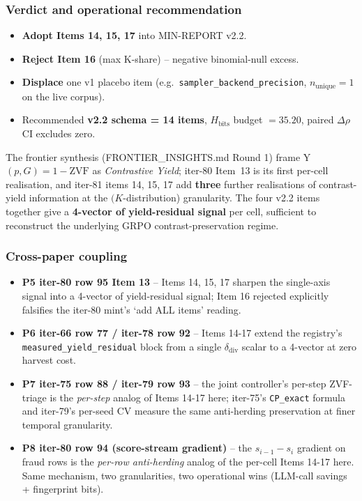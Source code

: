 \documentclass{article}  \usepackage[preprint,nonatbib]{neurips_2026} \usepackage[numbers]{natbib}
\begin{document}
\subsubsection{Verdict and operational recommendation}
\begin{itemize}
  \item \textbf{Adopt Items 14, 15, 17} into MIN-REPORT v2.2.
  \item \textbf{Reject Item 16} (max K-share) -- negative binomial-null excess.
  \item \textbf{Displace} one v1 placebo item (e.g.\ \texttt{sampler\_backend\_precision}, $n_{\mathrm{unique}}=1$ on the live corpus).
  \item Recommended \textbf{v2.2 schema = 14 items}, $H_{\mathrm{bits}}$ budget $= 35.20$, paired $\Delta\rho$ CI excludes zero.
\end{itemize}
The frontier synthesis (FRONTIER\_INSIGHTS.md Round 1) frame
Y$(p,G) = 1 - \mathrm{ZVF}$ as \emph{Contrastive Yield}; iter-80 Item~13 is
its first per-cell realisation, and iter-81 items 14, 15, 17 add
\textbf{three} further realisations of contrast-yield information at the
$(K$-distribution) granularity. The four v2.2 items together give a
\textbf{4-vector of yield-residual signal} per cell, sufficient to
reconstruct the underlying GRPO contrast-preservation regime.

\subsubsection{Cross-paper coupling}
\begin{itemize}
  \item \textbf{P5 iter-80 row 95 Item 13} -- Items 14, 15, 17 sharpen the
        single-axis signal into a 4-vector of yield-residual signal; Item 16
        rejected explicitly falsifies the iter-80 mint's `add ALL items' reading.
  \item \textbf{P6 iter-66 row 77 / iter-78 row 92} -- Items 14-17 extend
        the registry's \texttt{measured\_yield\_residual} block from a single
        $\delta_{\mathrm{div}}$ scalar to a 4-vector at zero harvest cost.
  \item \textbf{P7 iter-75 row 88 / iter-79 row 93} -- the joint controller's
        per-step ZVF-triage is the \emph{per-step} analog of Items 14-17 here;
        iter-75's \texttt{CP\_exact} formula and iter-79's per-seed CV measure
        the same anti-herding preservation at finer temporal granularity.
  \item \textbf{P8 iter-80 row 94 (score-stream gradient)} -- the
        $s_{i-1} - s_i$ gradient on fraud rows is the \emph{per-row anti-herding}
        analog of the per-cell Items 14-17 here. Same mechanism, two
        granularities, two operational wins (LLM-call savings + fingerprint
        bits).
\end{itemize}
\end{document}
